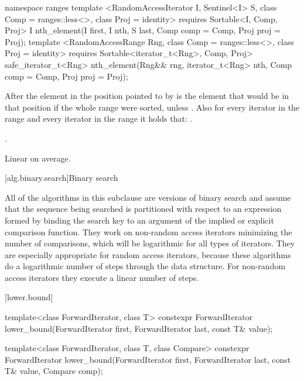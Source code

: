 \begin{addedblock}
%
\begin{itemdecl}
namespace ranges {
  template <RandomAccessIterator I, Sentinel<I> S, class Comp = ranges::less<>,
            class Proj = identity>
      requires Sortable<I, Comp, Proj>
    I nth_element(I first, I nth, S last, Comp comp = Comp{}, Proj proj = Proj{});
  template <RandomAccessRange Rng, class Comp = ranges::less<>, class Proj = identity>
      requires Sortable<iterator_t<Rng>, Comp, Proj>
    safe_iterator_t<Rng> nth_element(Rng&& rng, iterator_t<Rng> nth, Comp comp = Comp{},
                                     Proj proj = Proj{});
}
\end{itemdecl}

\begin{itemdescr}
\pnum
After
the element in the position pointed to by 
is the element that would be
in that position if the whole range were sorted, unless .
Also for every iterator
in the range
and every iterator
in the range
it holds that:
.

\pnum
\returns {}.

\pnum
\complexity
Linear on average.
\end{itemdescr}
\end{addedblock}

[alg.binary.search]{Binary search}

\pnum
All of the algorithms in this subclause are versions of binary search
and assume that the sequence being searched is partitioned with respect to
an expression formed by binding the search key to an argument of the
implied or explicit comparison function.
They work on non-random access iterators minimizing the number of comparisons,
which will be logarithmic for all types of iterators.
They are especially appropriate for random access iterators,
because these algorithms do a logarithmic number of steps
through the data structure.
For non-random access iterators they execute a linear number of steps.

[lower.bound]{}

%
\begin{itemdecl}
template<class ForwardIterator, class T>
  constexpr ForwardIterator
    lower_bound(ForwardIterator first, ForwardIterator last,
                const T& value);

template<class ForwardIterator, class T, class Compare>
  constexpr ForwardIterator
    lower_bound(ForwardIterator first, ForwardIterator last,
                const T& value, Compare comp);
\end{itemdecl}

